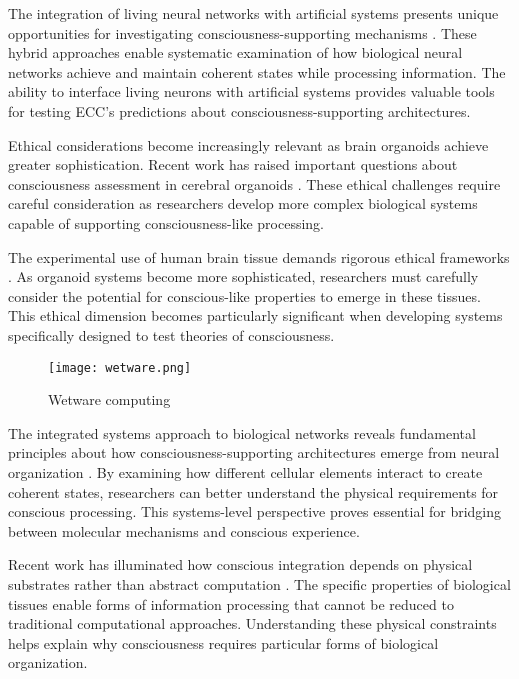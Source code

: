 \begin{refsection}
The integration of living neural networks with artificial systems presents unique opportunities for investigating consciousness-supporting mechanisms \cite{DeMarse2005}. These hybrid approaches enable systematic examination of how biological neural networks achieve and maintain coherent states while processing information. The ability to interface living neurons with artificial systems provides valuable tools for testing ECC's predictions about consciousness-supporting architectures.

Ethical considerations become increasingly relevant as brain organoids achieve greater sophistication. Recent work has raised important questions about consciousness assessment in cerebral organoids \cite{Lavazza2018}. These ethical challenges require careful consideration as researchers develop more complex biological systems capable of supporting consciousness-like processing.

The experimental use of human brain tissue demands rigorous ethical frameworks \cite{Farahany2018}. As organoid systems become more sophisticated, researchers must carefully consider the potential for conscious-like properties to emerge in these tissues. This ethical dimension becomes particularly significant when developing systems specifically designed to test theories of consciousness.

\begin{figure}[h]
    \centering
    \texttt{[image: wetware.png]}

    \caption{Wetware computing}
\end{figure}

The integrated systems approach to biological networks reveals fundamental principles about how consciousness-supporting architectures emerge from neural organization \cite{Zhang2016}. By examining how different cellular elements interact to create coherent states, researchers can better understand the physical requirements for conscious processing. This systems-level perspective proves essential for bridging between molecular mechanisms and conscious experience.

Recent work has illuminated how conscious integration depends on physical substrates rather than abstract computation \cite{Krishnan2019}. The specific properties of biological tissues enable forms of information processing that cannot be reduced to traditional computational approaches. Understanding these physical constraints helps explain why consciousness requires particular forms of biological organization.


\end{refsection}
